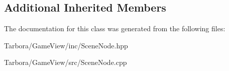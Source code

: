 \subsection*{Additional Inherited Members}


The documentation for this class was generated from the following files\+:\begin{DoxyCompactItemize}
\item 
Tarbora/\+Game\+View/inc/Scene\+Node.\+hpp\item 
Tarbora/\+Game\+View/src/Scene\+Node.\+cpp\end{DoxyCompactItemize}
